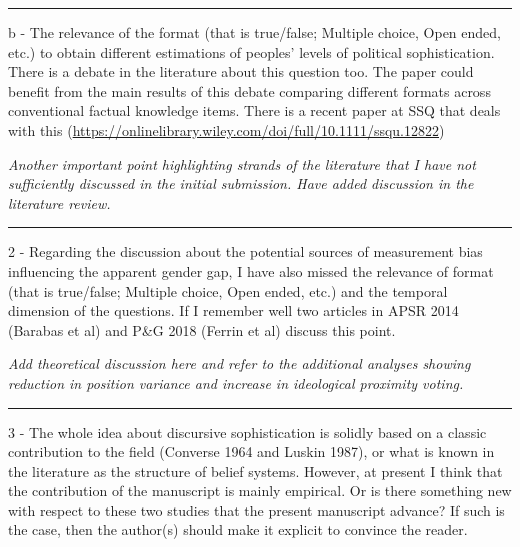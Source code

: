 
\rule{\linewidth}{.01cm}

b - The relevance of the format (that is true/false; Multiple choice, Open ended, etc.) to obtain different estimations of peoples' levels of political sophistication. There is a debate in the literature about this question too. The paper could benefit from the main results of this debate comparing different formats across conventional factual knowledge items. There is a recent paper at SSQ that deals with this (\url{https://onlinelibrary.wiley.com/doi/full/10.1111/ssqu.12822})

\textit{Another important point highlighting strands of the literature that I have not sufficiently discussed in the initial submission. Have added discussion in the literature review.}


\rule{\linewidth}{.01cm}

2 - Regarding the discussion about the potential sources of measurement bias influencing the apparent gender gap, I have also missed the relevance of format (that is true/false; Multiple choice, Open ended, etc.) and the temporal dimension of the questions. If I remember well two articles in APSR 2014 (Barabas et al) and P\&G 2018 (Ferrin et al) discuss this point.

\textit{Add theoretical discussion here and refer to the additional analyses showing reduction in position variance and increase in ideological proximity voting.}


\rule{\linewidth}{.01cm}

3 - The whole idea about discursive sophistication is solidly based on a classic contribution to the field (Converse 1964 and Luskin 1987), or what is known in the literature as the structure of belief systems. However, at present I think that the contribution of the manuscript is mainly empirical. Or is there something new with respect to these two studies that the present manuscript advance? If such is the case, then the author(s) should make it explicit to convince the reader.

